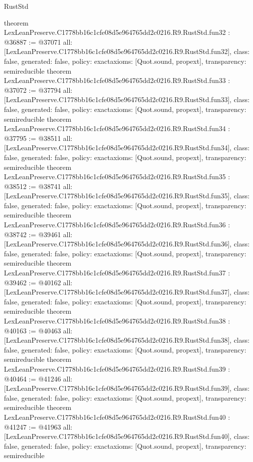 \begin{lexlean}{RustStd}
\begin{coremodule}
{}
theorem LexLeanPreserve.C1778bb16c1cfe08d5e964765dd2c0216.R9.RustStd.fun32 : @36887 := @37071 {
  all: [LexLeanPreserve.C1778bb16c1cfe08d5e964765dd2c0216.R9.RustStd.fun32],
  class: false,
  generated: false,
  policy: exact{axioms: [Quot.sound, propext]},
  transparency: semireducible
}
theorem LexLeanPreserve.C1778bb16c1cfe08d5e964765dd2c0216.R9.RustStd.fun33 : @37072 := @37794 {
  all: [LexLeanPreserve.C1778bb16c1cfe08d5e964765dd2c0216.R9.RustStd.fun33],
  class: false,
  generated: false,
  policy: exact{axioms: [Quot.sound, propext]},
  transparency: semireducible
}
theorem LexLeanPreserve.C1778bb16c1cfe08d5e964765dd2c0216.R9.RustStd.fun34 : @37795 := @38511 {
  all: [LexLeanPreserve.C1778bb16c1cfe08d5e964765dd2c0216.R9.RustStd.fun34],
  class: false,
  generated: false,
  policy: exact{axioms: [Quot.sound, propext]},
  transparency: semireducible
}
theorem LexLeanPreserve.C1778bb16c1cfe08d5e964765dd2c0216.R9.RustStd.fun35 : @38512 := @38741 {
  all: [LexLeanPreserve.C1778bb16c1cfe08d5e964765dd2c0216.R9.RustStd.fun35],
  class: false,
  generated: false,
  policy: exact{axioms: [Quot.sound, propext]},
  transparency: semireducible
}
theorem LexLeanPreserve.C1778bb16c1cfe08d5e964765dd2c0216.R9.RustStd.fun36 : @38742 := @39461 {
  all: [LexLeanPreserve.C1778bb16c1cfe08d5e964765dd2c0216.R9.RustStd.fun36],
  class: false,
  generated: false,
  policy: exact{axioms: [Quot.sound, propext]},
  transparency: semireducible
}
theorem LexLeanPreserve.C1778bb16c1cfe08d5e964765dd2c0216.R9.RustStd.fun37 : @39462 := @40162 {
  all: [LexLeanPreserve.C1778bb16c1cfe08d5e964765dd2c0216.R9.RustStd.fun37],
  class: false,
  generated: false,
  policy: exact{axioms: [Quot.sound, propext]},
  transparency: semireducible
}
theorem LexLeanPreserve.C1778bb16c1cfe08d5e964765dd2c0216.R9.RustStd.fun38 : @40163 := @40463 {
  all: [LexLeanPreserve.C1778bb16c1cfe08d5e964765dd2c0216.R9.RustStd.fun38],
  class: false,
  generated: false,
  policy: exact{axioms: [Quot.sound, propext]},
  transparency: semireducible
}
theorem LexLeanPreserve.C1778bb16c1cfe08d5e964765dd2c0216.R9.RustStd.fun39 : @40464 := @41246 {
  all: [LexLeanPreserve.C1778bb16c1cfe08d5e964765dd2c0216.R9.RustStd.fun39],
  class: false,
  generated: false,
  policy: exact{axioms: [Quot.sound, propext]},
  transparency: semireducible
}
theorem LexLeanPreserve.C1778bb16c1cfe08d5e964765dd2c0216.R9.RustStd.fun40 : @41247 := @41963 {
  all: [LexLeanPreserve.C1778bb16c1cfe08d5e964765dd2c0216.R9.RustStd.fun40],
  class: false,
  generated: false,
  policy: exact{axioms: [Quot.sound, propext]},
  transparency: semireducible
}
\end{coremodule}
\end{lexlean}
